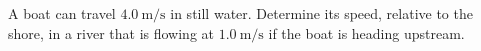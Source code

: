 A boat can travel $4.0\ \mathrm{m}/\mathrm{s}$ in still water. 
Determine its speed, relative to the shore, in a river that is flowing at 
$1.0\ \mathrm{m}/\mathrm{s}$ if the boat is heading upstream.